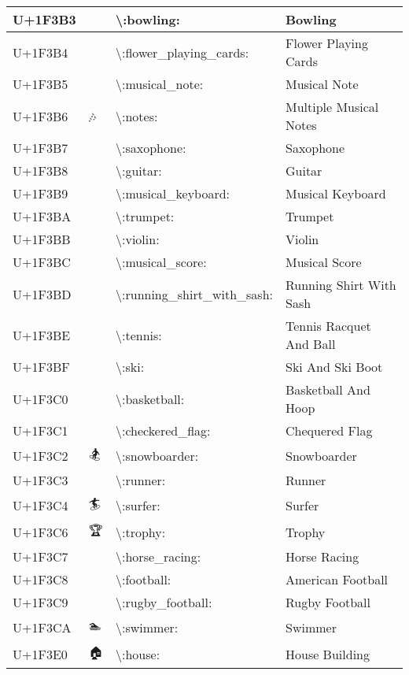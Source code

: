 \begin{table}[h]
\begin{tabulary}{\linewidth}{|L|L|L|L|}
\hline
U+1F3B3 & 🎳 & {\textbackslash}:bowling: & Bowling \\
\hline
U+1F3B4 & 🎴 & {\textbackslash}:flower\_playing\_cards: & Flower Playing Cards \\
\hline
U+1F3B5 & 🎵 & {\textbackslash}:musical\_note: & Musical Note \\
\hline
U+1F3B6 & 🎶 & {\textbackslash}:notes: & Multiple Musical Notes \\
\hline
U+1F3B7 & 🎷 & {\textbackslash}:saxophone: & Saxophone \\
\hline
U+1F3B8 & 🎸 & {\textbackslash}:guitar: & Guitar \\
\hline
U+1F3B9 & 🎹 & {\textbackslash}:musical\_keyboard: & Musical Keyboard \\
\hline
U+1F3BA & 🎺 & {\textbackslash}:trumpet: & Trumpet \\
\hline
U+1F3BB & 🎻 & {\textbackslash}:violin: & Violin \\
\hline
U+1F3BC & 🎼 & {\textbackslash}:musical\_score: & Musical Score \\
\hline
U+1F3BD & 🎽 & {\textbackslash}:running\_shirt\_with\_sash: & Running Shirt With Sash \\
\hline
U+1F3BE & 🎾 & {\textbackslash}:tennis: & Tennis Racquet And Ball \\
\hline
U+1F3BF & 🎿 & {\textbackslash}:ski: & Ski And Ski Boot \\
\hline
U+1F3C0 & 🏀 & {\textbackslash}:basketball: & Basketball And Hoop \\
\hline
U+1F3C1 & 🏁 & {\textbackslash}:checkered\_flag: & Chequered Flag \\
\hline
U+1F3C2 & 🏂 & {\textbackslash}:snowboarder: & Snowboarder \\
\hline
U+1F3C3 & 🏃 & {\textbackslash}:runner: & Runner \\
\hline
U+1F3C4 & 🏄 & {\textbackslash}:surfer: & Surfer \\
\hline
U+1F3C6 & 🏆 & {\textbackslash}:trophy: & Trophy \\
\hline
U+1F3C7 & 🏇 & {\textbackslash}:horse\_racing: & Horse Racing \\
\hline
U+1F3C8 & 🏈 & {\textbackslash}:football: & American Football \\
\hline
U+1F3C9 & 🏉 & {\textbackslash}:rugby\_football: & Rugby Football \\
\hline
U+1F3CA & 🏊 & {\textbackslash}:swimmer: & Swimmer \\
\hline
U+1F3E0 & 🏠 & {\textbackslash}:house: & House Building \\

\end{tabulary}
\end{table}
